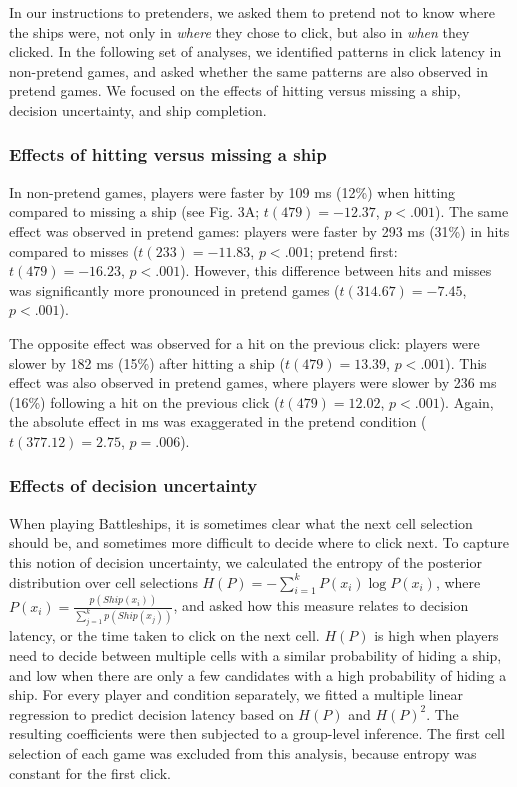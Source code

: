 \documentclass[10pt, letterpaper]{article}
\begin{document}
In our instructions to pretenders, we asked them to pretend not to know
where the ships were, not only in \emph{where} they chose to click, but
also in \emph{when} they clicked. In the following set of analyses, we
identified patterns in click latency in non-pretend games, and asked
whether the same patterns are also observed in pretend games. We focused
on the effects of hitting versus missing a ship, decision uncertainty,
and ship completion.

\hypertarget{effects-of-hitting-versus-missing-a-ship}{%
\subsubsection{Effects of hitting versus missing a
ship}\label{effects-of-hitting-versus-missing-a-ship}}

In non-pretend games, players were faster by 109 ms (12\%) when hitting
compared to missing a ship (see Fig. 3A; \(t(479) = -12.37\),
\(p < .001\)). The same effect was observed in pretend games: players
were faster by 293 ms (31\%) in hits compared to misses
(\(t(233) = -11.83\), \(p < .001\); pretend first: \(t(479) = -16.23\),
\(p < .001\)). However, this difference between hits and misses was
significantly more pronounced in pretend games (\(t(314.67) = -7.45\),
\(p < .001\)).

The opposite effect was observed for a hit on the previous click:
players were slower by 182 ms (15\%) after hitting a ship
(\(t(479) = 13.39\), \(p < .001\)). This effect was also observed in
pretend games, where players were slower by 236 ms (16\%) following a
hit on the previous click (\(t(479) = 12.02\), \(p < .001\)). Again, the
absolute effect in ms was exaggerated in the pretend condition
(\(t(377.12) = 2.75\), \(p = .006\)).

\hypertarget{effects-of-decision-uncertainty}{%
\subsubsection{Effects of decision
uncertainty}\label{effects-of-decision-uncertainty}}

When playing Battleships, it is sometimes clear what the next cell
selection should be, and sometimes more difficult to decide where to
click next. To capture this notion of decision uncertainty, we
calculated the entropy of the posterior distribution over cell
selections \(H(P)=-\sum_{i=1}^{k}P(x_i) \log P(x_{i})\), where
\(P(x_{i})=\frac{p(Ship(x_i))}{\sum_{j=1}^{k}p(Ship(x_j))}\), and asked
how this measure relates to decision latency, or the time taken to click
on the next cell. \(H(P)\) is high when players need to decide between
multiple cells with a similar probability of hiding a ship, and low when
there are only a few candidates with a high probability of hiding a
ship. For every player and condition separately, we fitted a multiple
linear regression to predict decision latency based on \(H(P)\) and
\(H(P)^2\). The resulting coefficients were then subjected to a
group-level inference. The first cell selection of each game was
excluded from this analysis, because entropy was constant for the first
click.
\end{document}
